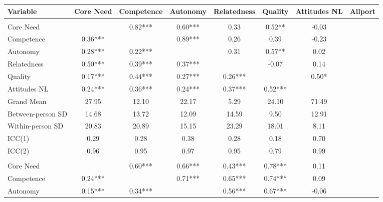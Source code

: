 
\begin{tabular}[t]{lccccccc}
\toprule
Variable & Core Need & Competence & Autonomy & Relatedness & Quality & Attitudes NL & Allport\\
\midrule
\addlinespace[0.3em]
\multicolumn{8}{l}{\textbf{Study 1}}\\
\hspace{1em}Core Need &  & 0.82*** & 0.60*** & 0.33 & 0.52** & -0.03 & \\
\hspace{1em}Competence & 0.36*** &  & 0.89*** & 0.26 & 0.39 & -0.23 & \\
\hspace{1em}Autonomy & 0.28*** & 0.22*** &  & 0.31 & 0.57** & 0.02 & \\
\hspace{1em}Relatedness & 0.50*** & 0.39*** & 0.37*** &  & -0.07 & 0.14 & \\
\hspace{1em}Quality & 0.17*** & 0.44*** & 0.27*** & 0.26*** &  & 0.50* & \\
\hspace{1em}Attitudes NL & 0.24*** & 0.36*** & 0.24*** & 0.37*** & 0.52*** &  & \\
\addlinespace
\hspace{1em}Grand Mean & 27.95 & 12.10 & 22.17 & 5.29 & 24.10 & 71.49 & \\
\hspace{1em}Between-person SD & 14.68 & 13.72 & 12.09 & 14.59 & 9.50 & 12.91 & \\
\hspace{1em}Within-person SD & 20.83 & 20.89 & 15.15 & 23.29 & 18.01 & 8.11 & \\
\hspace{1em}ICC(1) & 0.29 & 0.28 & 0.38 & 0.28 & 0.18 & 0.70 & \\
\hspace{1em}ICC(2) & 0.96 & 0.95 & 0.97 & 0.95 & 0.79 & 0.99 & \\
\addlinespace[0.3em]
\multicolumn{8}{l}{\textbf{Study 2}}\\
\hspace{1em}Core Need &  & 0.60*** & 0.66*** & 0.43*** & 0.78*** & 0.11 & \\
\hspace{1em}Competence & 0.24*** &  & 0.71*** & 0.65*** & 0.74*** & 0.09 & \\
\hspace{1em}Autonomy & 0.15*** & 0.34*** &  & 0.56*** & 0.67*** & -0.06 & \\

\end{tabular}

